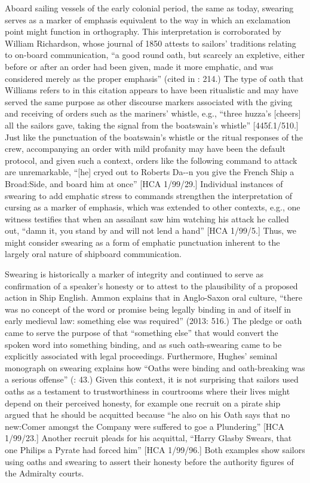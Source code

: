   Aboard sailing vessels of the early colonial period, the same as today, swearing serves as a marker of emphasis equivalent to the way in which an exclamation point might function in orthography. This interpretation is corroborated by William Richardson, whose journal of 1850 attests to sailors’ traditions relating to on-board communication, “a good round oath, but scarcely an expletive, either before or after an order had been given, made it more emphatic, and was considered merely as the proper emphasis” (cited in \citealt{AdkinsAdkins2008}: 214.) The type of oath that Williams refers to in this citation appears to have been ritualistic and may have served the same purpose as other discourse markers associated with the giving and receiving of orders such as the mariners’ whistle, e.g., “three huzza’s [cheers] all the sailors gave, taking the signal from the boatswain’s whistle” [445f.1/510.] Just like the punctuation of the boatswain’s whistle or the ritual responses of the crew, accompanying an order with mild profanity may have been the default protocol, and given such a context, orders like the following command to attack are unremarkable, “[he] cryed out to Roberts Da-{}-n you give the French Ship a Broad:Side, and board him at once” [HCA 1/99/29.] Individual instances of swearing to add emphatic stress to commands strengthen the interpretation of cursing as a marker of emphasis, which was extended to other contexts, e.g., one witness testifies that when an assailant saw him watching his attack he called out, “damn it, you stand by and will not lend a hand” [HCA 1/99/5.] Thus, we might consider swearing as a form of emphatic punctuation inherent to the largely oral nature of shipboard communication. 

  Swearing is historically a marker of integrity and continued to serve as confirmation of a speaker’s honesty or to attest to the plausibility of a proposed action in Ship English. Ammon explains that in Anglo-Saxon oral culture, “there was no concept of the word or promise being legally binding in and of itself in early medieval law: something else was required” (2013: 516.) The pledge or oath came to serve the purpose of that “something else” that would convert the spoken word into something binding, and as such oath-swearing came to be explicitly associated with legal proceedings. Furthermore, Hughes’ seminal monograph on swearing explains how “Oaths were binding and oath-breaking was a serious offense” (\citealt{Hughes1991}: 43.) Given this context, it is not surprising that sailors used oaths as a testament to trustworthiness in courtrooms where their lives might depend on their perceived honesty, for example one recruit on a pirate ship argued that he should be acquitted because “he also on his Oath says that no new:Comer amongst the Company were suffered to goe a Plundering” [HCA 1/99/23.] Another recruit pleads for his acquittal, “Harry Glasby Swears, that one Philips a Pyrate had forced him” [HCA 1/99/96.] Both examples show sailors using oaths and swearing to assert their honesty before the authority figures of the Admiralty courts. 

